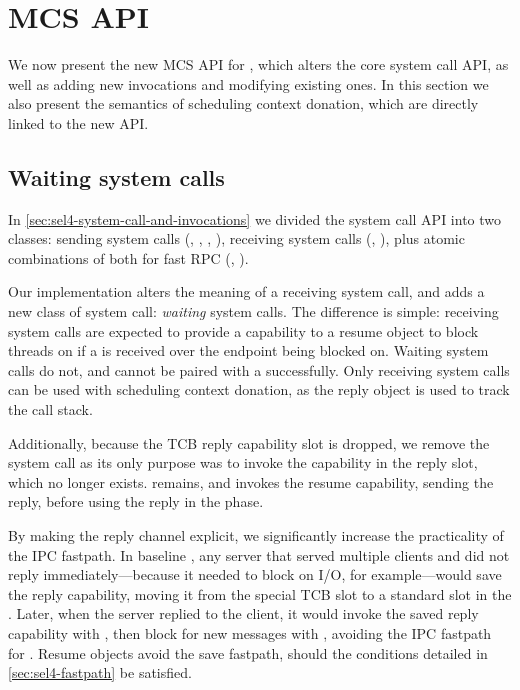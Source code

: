 \section{MCS API}
\label{s:new-api}

We now present the new \gls{MCS} API for \selfour, which alters the core system call API, 
as well as adding new invocations and modifying existing ones. In this section we also
present the semantics of scheduling context donation, which are directly linked to the new API.

\subsection{Waiting system calls}

In \cref{sec:sel4-system-call-and-invocations} we divided the \selfour system call API into two
classes: sending system calls (, , , ),
receiving system calls (, ), plus atomic combinations of both for fast 
RPC (, ).  

Our implementation alters the meaning of a receiving system call, and adds a new class of system
call: \emph{waiting} system calls. The difference is simple: receiving system calls are expected to
provide a capability to a resume object to block threads on if a  is received over
the endpoint being blocked on. Waiting system calls do not, and cannot be paired with a 
successfully. Only receiving system calls can be used with scheduling context donation, as the reply
object is used to track the call stack.

Additionally, because the TCB reply capability slot is dropped, we remove the  system
call as its only purpose was to invoke the capability in the reply slot, which no longer exists.
 remains, and invokes the resume capability, sending the reply, before using the
reply in the  phase. 

By making the reply channel explicit, we significantly increase the practicality of the IPC
fastpath. In baseline \selfour, any server that served multiple clients and did not reply
immediately---because it needed to block on I/O, for example---would save the reply
capability, moving it from the special TCB slot to a standard slot in the . Later, when
the server replied to the client, it would invoke the saved reply capability with \send, then block
for new messages with \recv, avoiding the IPC fastpath for \replyrecv. Resume objects avoid the save
fastpath, should the conditions detailed in \cref{sec:sel4-fastpath} be satisfied.

